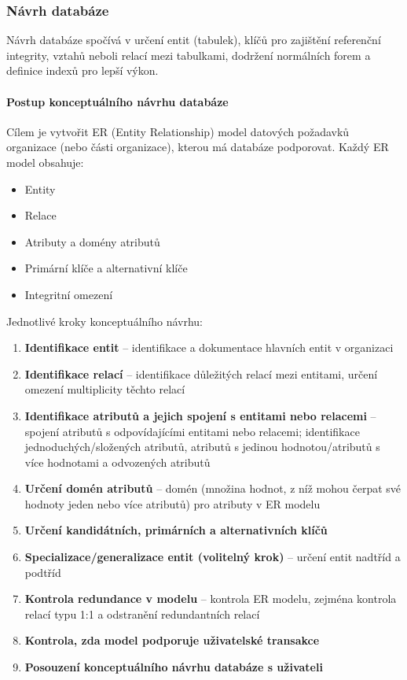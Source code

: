 \documentclass[12pt,a4paper]{article}
\begin{document}
\subsubsection{Návrh databáze}

Návrh databáze spočívá v určení entit (tabulek), klíčů pro zajištění referenční integrity, vztahů
neboli relací mezi tabulkami, dodržení normálních forem a definice indexů pro lepší výkon.

\paragraph{Postup konceptuálního návrhu databáze}
Cílem je vytvořit ER (Entity Relationship) model datových požadavků organizace (nebo části
organizace), kterou má databáze podporovat. Každý ER model obsahuje:
\begin{itemize}
  \item Entity
  \item Relace
  \item Atributy a domény atributů
  \item Primární klíče a alternativní klíče
  \item Integritní omezení
\end{itemize}

Jednotlivé kroky konceptuálního návrhu:
\begin{enumerate}
  \item \textbf{Identifikace entit} -- identifikace a dokumentace hlavních entit v organizaci
  \item \textbf{Identifikace relací} -- identifikace důležitých relací mezi entitami, určení omezení
    multiplicity těchto relací
  \item \textbf{Identifikace atributů a jejich spojení s entitami nebo relacemi} -- spojení atributů
    s odpovídajícími entitami nebo relacemi; identifikace jednoduchých/složených atributů,
    atributů s jedinou hodnotou/atributů s více hodnotami a odvozených atributů
  \item \textbf{Určení domén atributů} -- domén (množina hodnot, z níž mohou čerpat své hodnoty
    jeden nebo více atributů) pro atributy v ER modelu
  \item \textbf{Určení kandidátních, primárních a alternativních klíčů}
  \item \textbf{Specializace/generalizace entit (volitelný krok)} -- určení entit nadtříd a podtříd
  \item \textbf{Kontrola redundance v modelu} -- kontrola ER modelu, zejména kontrola relací typu
    1:1 a odstranění redundantních relací
  \item \textbf{Kontrola, zda model podporuje uživatelské transakce}
  \item \textbf{Posouzení konceptuálního návrhu databáze s uživateli}
\end{enumerate}
\end{document}
